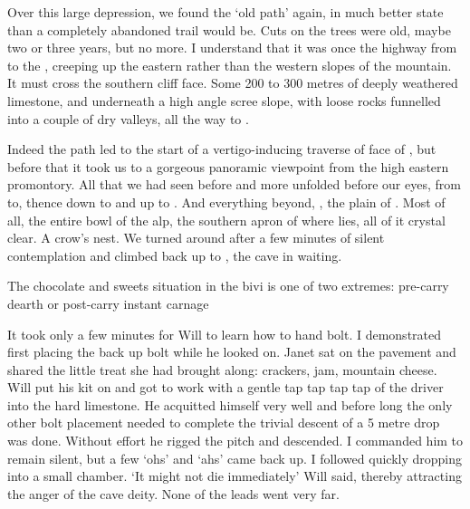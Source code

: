 Over this large depression, we found the `old  path' again, in much better state than a completely abandoned trail would be. Cuts on the trees were old, maybe two or three years, but no more. I understand that it was once the highway from  to the , creeping up the eastern rather than the western slopes of the mountain. It must cross the  southern cliff face. Some 200 to 300 metres of deeply weathered limestone, and underneath a high angle scree slope, with loose rocks funnelled into a couple of dry valleys, all the way to . 

Indeed the path led to the start of a vertigo-inducing traverse of face of , but before that it took us to a gorgeous panoramic viewpoint from the high eastern promontory. All that we had seen before and more unfolded before our eyes, from  to, thence down to  and up to . And everything beyond, , the plain of . Most of all, the entire bowl of the  alp, the southern apron of  where  lies, all of it crystal clear. A crow's nest. We turned around after a few minutes of silent contemplation and climbed back up to , the cave in waiting. 

\begin{marginfigure}
\centering
{}
\label{chocolate}
\caption{The chocolate and sweets situation in the bivi is one of two extremes: pre-carry dearth or post-carry instant carnage }
\end{marginfigure}

It took only a few minutes for Will to learn how to hand bolt. I demonstrated first placing the back up bolt while he looked on. Janet sat on the pavement and shared the little treat she had brought along: crackers, jam, mountain cheese. Will put his kit on and got to work with a gentle tap tap tap tap  of the driver into the hard limestone. He acquitted himself very well and before long the only other bolt placement needed to complete the trivial descent of a 5 metre drop was done. Without effort he rigged the pitch and descended. I commanded him to remain silent, but a few `ohs' and `ahs' came back up. I followed quickly dropping into a small chamber.
`It might not die immediately' Will said, thereby attracting the anger of the cave deity. None of the leads went very far. 

